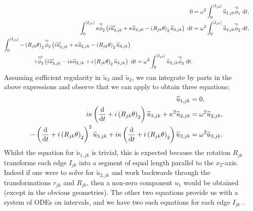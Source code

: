 \begin{subequations} \label{eq:SplitVariationalEdgeEqns}
	\begin{align}
		0 &= \omega^2 \int_0^{\left\lvert I_{jk} \right\rvert} \widetilde{u}_{1,jk}\overline{\widetilde{\phi}}_1 \ \mathrm{d} t, \\
		\int_0^{\left\lvert I_{jk} \right\rvert} \kappa\overline{\widetilde{\phi}}_2\left( i\widetilde{u}_{3,jk}' + \kappa\widetilde{u}_{2,jk} - \left( R_{jk}\theta \right)_2\widetilde{u}_{3,jk} \right) \ \mathrm{d} t
		&= \omega^2 \int_0^{\left\lvert I_{jk} \right\rvert} \widetilde{u}_{2,jk}\overline{\widetilde{\phi}}_2 \ \mathrm{d} t, \\
		\begin{split}
			\int_0^{\left\lvert I_{jk} \right\rvert} -\left( R_{jk}\theta \right)_2\overline{\widetilde{\phi}}_3\left( i\widetilde{u}_{3,jk}' + \kappa\widetilde{u}_{2,jk} - \left( R_{jk}\theta \right)_2\widetilde{u}_{3,jk} \right) \quad & \\
			+ \overline{\widetilde{\phi}}_3'\left( i\widetilde{u}_{3,jk}' - i\kappa\widetilde{u}_{2,jk} + i\left( R_{jk}\theta \right)_2\widetilde{u}_{3,jk} \right) \ \mathrm{d} t
			&= \omega^2 \int_0^{\left\lvert I_{jk} \right\rvert} \widetilde{u}_{3,jk}\overline{\widetilde{\phi}}_3 \ \mathrm{d} t.
		\end{split}
	\end{align}
\end{subequations}
Assuming sufficient regularity in $\widetilde{u}_3$ and $\widetilde{u}_2$, we can integrate by parts in the above expressions and observe that we can apply  to obtain three equations;
\begin{align*}
	\widetilde{u}_{1,jk} &= 0, \\
	i\kappa\left( \dfrac{\mathrm{d}}{\mathrm{d}t} + i\left( R_{jk}\theta \right)_2 \right)\widetilde{u}_{3,jk} + \kappa^2\widetilde{u}_{2,jk} &= \omega^2 \widetilde{u}_{2,jk}, \\
	-\left( \dfrac{\mathrm{d}}{\mathrm{d}t} + i\left( R_{jk}\theta \right)_2 \right)^2\widetilde{u}_{3,jk} + i\kappa\left( \dfrac{\mathrm{d}}{\mathrm{d}t} + i\left( R_{jk}\theta \right)_2 \right)\widetilde{u}_{2,jk} &= \omega^2\widetilde{u}_{3,jk}.
\end{align*}
Whilst the equation for $\widetilde{u}_{1,jk}$ is trivial, this is expected because the rotation $R_{jk}$ transforms each edge $I_{jk}$ into a segment of equal length parallel to the $x_2$-axis.
Indeed if one were to solve for $\widetilde{u}_{2,jk}$ and work backwards through the transformations $r_{jk}$ and $R_{jk}$, then a non-zero component $u_1$ would be obtained (except in the obvious geometries).
The other two equations provide us with a system of ODEs on intervals, and we have two such equations for each edge $I_{jk}$ .
